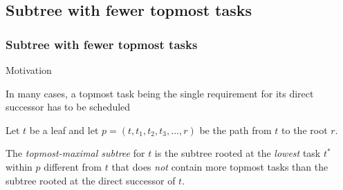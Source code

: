 \documentclass{beamer}
\newenvironment{strategyblock}
{
  \begin{block}{Strategy}
}
{
  \end{block}
}
\newenvironment{motivationblock}
{
  \begin{block}{Motivation}
}
{
  \end{block}
}
\newcommand{\todo}[1]{ {\color{red}{#1} }}
\begin{document}

\subsection{Subtree with fewer topmost tasks}

\begin{frame}
  \frametitle{Subtree with fewer topmost tasks}
  \begin{motivationblock}
    In many cases, a topmost task being the single requirement for its direct successor has to be scheduled
  \end{motivationblock}
  \begin{definition}
    Let $t$ be a leaf and let $p=(t, t_1, t_2, t_3, \dots, r)$ be the path from $t$ to the root $r$.

    The \emph{topmost-maximal subtree} for $t$ is the subtree rooted at the \emph{lowest} task $t^*$ within $p$ different from $t$ that does \emph{not} contain more topmost tasks than the subtree rooted at the direct successor of $t$. 
  \end{definition}
\end{frame}


\end{document}
